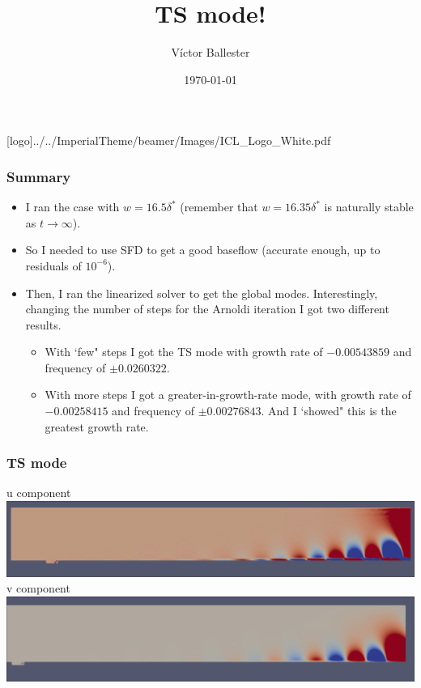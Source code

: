 \documentclass[
	aspectratio=169, %
	t, %
	onlytextwidth, %
	10pt, %
]{beamer}
\title{TS mode!} %
\subtitle{} %
\author{Víctor Ballester} %
\date{\today} %
\def\imagefolder{../../ImperialTheme/beamer/Images}
\begin{document}
\begingroup
{} %
[logo]{\imagefolder/ICL_Logo_White.pdf} %
\frame[plain, s]{\titlepage} %
\endgroup

\begin{frame}
	\frametitle{Summary}
	\begin{itemize}
		\item I ran the case with $w=16.5 \delta^*$ (remember that $w=16.35 \delta^*$ is naturally stable as $t\to\infty$).
		\item So I needed to use SFD to get a good baseflow (accurate enough, up to residuals of $10^{-6}$).
		\item Then, I ran the linearized solver to get the global modes. Interestingly, changing the number of steps for the Arnoldi iteration I got two different results. 
		\begin{itemize}
			\item With `few" steps I got the TS mode with growth rate of $-0.00543859$ and frequency of $\pm 0.0260322$.
			\item With more steps I got a greater-in-growth-rate mode, with growth rate of $-0.00258415$ and frequency of $\pm 0.00276843$. And I `showed" this is the greatest growth rate.
		\end{itemize}
	\end{itemize}
        
\end{frame}
\begin{frame}
	\frametitle{TS mode}
	{
	u component
	\centering
	\includegraphics[width=\linewidth]{Images/TSu.png}
	v component
	\includegraphics[width=\linewidth]{Images/TSv.png}
	}
\end{frame}
\end{document}
